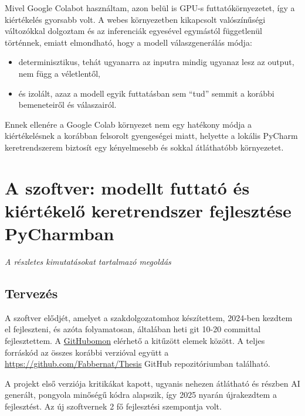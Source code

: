 \documentclass[12pt]{report}
\begin{document}
    Mivel Google Colabot használtam, azon belül is GPU-s futtatókörnyezetet, így a kiértékelés gyorsabb volt.
    A webes környezetben kikapcsolt valószínűségi változókkal dolgoztam és az inferenciák egyesével egymástól függetlenül történnek, emiatt elmondható, hogy a modell válaszgenerálás módja:
    \begin{itemize}
        \item determinisztikus, tehát ugyanarra az inputra mindig ugyanaz lesz az output, nem függ a véletlentől,
        \item és izolált, azaz a modell egyik futtatásban sem ``tud'' semmit a korábbi bemeneteiről és válaszairól.
    \end{itemize}
    Ennek ellenére a Google Colab környezet nem egy hatékony módja a kiértékelésnek a korábban felsorolt gyengeségei miatt, helyette a lokális PyCharm keretrendszerem biztosít egy kényelmesebb és sokkal átláthatóbb környezetet.
    \clearpage

    \newcommand{\chapterwithdesc}[2]{%
        \chapter{#1}%
        \vspace{-1ex}%
        {\large\itshape #2\par}%
        \vspace{2ex}%
    }
    \chapterwithdesc{A szoftver: modellt futtató és kiértékelő keretrendszer fejlesztése PyCharmban}
    {A részletes kimutatásokat tartalmazó megoldás}
    \label{chap:src/Framework}


    \section{Tervezés}
    A szoftver elődjét, amelyet a szakdolgozatomhoz készítettem, 2024-ben kezdtem el fejleszteni, és azóta folyamatosan, általában heti git 10-20 committal fejlesztettem. A \href{https://github.com/Fabbernat}{GitHubomon} elérhető a kitűzött elemek között.
    A teljes forráskód az összes korábbi verzióval együtt a\\
    \href{https://github.com/Fabbernat/Thesis} {https://github.com/Fabbernat/Thesis} GitHub repozitóriumban található.

    A projekt első verziója kritikákat kapott, ugyanis nehezen átlátható és részben AI generált, pongyola minőségű kódra alapszik, így 2025 nyarán újrakezdtem a fejlesztést. Az új szoftvernek 2 fő fejlesztési szempontja volt.
\end{document}

